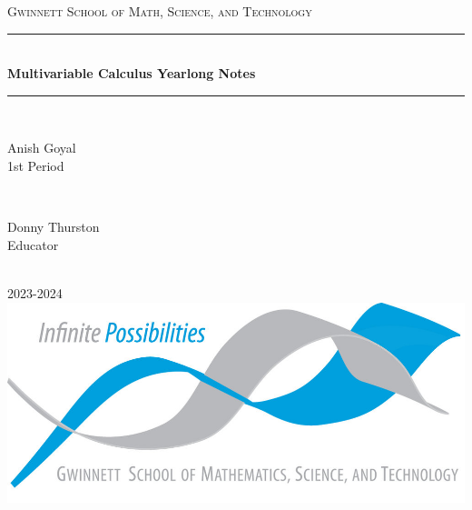 \begin{titlepage}

    \newcommand{\HRule}{\rule{\linewidth}{0.5mm}}
    
    \center
    
    \vspace{10cm}

    \textsc{\LARGE Gwinnett School of Math, Science, and Technology }\\[0.3cm]
    
    \vspace{0.5cm}

    \HRule \\[0.4cm]
    { \huge \bfseries Multivariable Calculus Yearlong Notes}\\[0.03cm]
    \HRule \\[1.5cm]
    
    \begin{minipage}{0.4\textwidth}
    \begin{flushleft} \Large
    Anish Goyal \\1st Period
    \end{flushleft}
    \end{minipage}
    ~
    \begin{minipage}{0.4\textwidth}
    \begin{flushright} \Large
    Donny Thurston\\Educator
    \end{flushright}
    \end{minipage}\\[1cm]
    
    {\huge 2023-2024}\\[1cm]
    
    \includegraphics{img/logo.png}\\
    \vfill
    \end{titlepage}